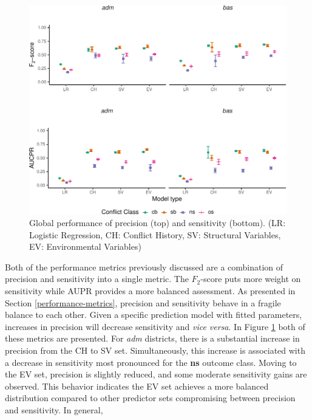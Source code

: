 \documentclass[a4paper,11pt]{article}
\begin{document}
\begin{figure}[H]

{\centering \includegraphics{thesis_files/figure-latex/04-results-global-prsens-1} 

}

\caption[Global performance of precision and sensitivity.]{Global performance of precision (top) and sensitivity (bottom). (LR: Logistic Regression, CH: Conflict History, SV: Structural Variables, EV: Environmental Variables)}\label{fig:04-results-global-prsens}
\end{figure}
Both of the performance metrics previously discussed are a combination of
precision and sensitivity into a single metric. The \(F_2\)-score puts more weight
on sensitivity while AUPR provides a more balanced assessment. As presented in Section
\ref{performance-metrics}, precision and sensitivity behave in a fragile balance to each
other. Given a specific prediction model with fitted parameters, increases
in precision will decrease sensitivity and \emph{vice versa}. In Figure \ref{fig:04-results-global-prsens}
both of these metrics are presented.
For \emph{adm} districts, there is a substantial increase in precision from the CH to
SV set. Simultaneously, this increase is associated with a decrease in sensitivity
most pronounced for the \textbf{ns} outcome class. Moving to the EV set, precision is
slightly reduced, and some moderate sensitivity gains are observed. This behavior
indicates the EV set achieves a more balanced distribution compared to
other predictor sets compromising between precision and sensitivity. In general,
\end{document}

